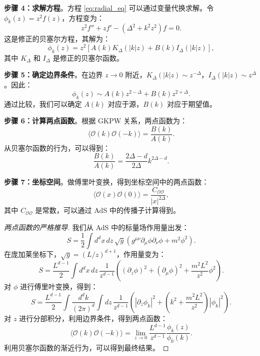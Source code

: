 \textbf{步骤 4：求解方程}。方程 \eqref{eq:radial_eq} 可以通过变量代换求解。令 $\phi_k(z) = z^2 f(z)$，方程变为：
\begin{equation}
    z^2 f'' + z f' - \left(\Delta^2 + k^2 z^2\right) f = 0.
\end{equation}
这是修正的贝塞尔方程，其解为：
\begin{equation}
    \phi_k(z) = z^2 \left[ A(k) K_\Delta(|k|z) + B(k) I_\Delta(|k|z) \right],
\end{equation}
其中 $K_\Delta$ 和 $I_\Delta$ 是修正的贝塞尔函数。

\textbf{步骤 5：确定边界条件}。在边界 $z \to 0$ 附近，$K_\Delta(|k|z) \sim z^{-\Delta}$，$I_\Delta(|k|z) \sim z^\Delta$。因此：
\begin{equation}
    \phi_k(z) \sim A(k) z^{2-\Delta} + B(k) z^{2+\Delta}.
\end{equation}
通过比较，我们可以确定 $A(k)$ 对应于源，$B(k)$ 对应于期望值。

\textbf{步骤 6：计算两点函数}。根据 GKPW 关系，两点函数为：
\begin{equation}
    \langle \mathcal{O}(k) \mathcal{O}(-k) \rangle = \frac{B(k)}{A(k)}.
\end{equation}
从贝塞尔函数的行为，可以得到：
\begin{equation}
    \frac{B(k)}{A(k)} = \frac{2\Delta - d}{2\Delta} k^{2\Delta - d}.
\end{equation}

\textbf{步骤 7：坐标空间}。做傅里叶变换，得到坐标空间中的两点函数：
\begin{equation}
    \langle \mathcal{O}(x) \mathcal{O}(0) \rangle = \frac{C_{\mathcal{O}\mathcal{O}}}{|x|^{2\Delta}},
\end{equation}
其中 $C_{\mathcal{O}\mathcal{O}}$ 是常数，可以通过 AdS 中的传播子计算得到。

\begin{proof}[两点函数的严格推导]
我们从 AdS 中的标量场作用量出发：
\begin{equation}
    S = \frac{1}{2} \int d^d x \, dz \, \sqrt{g} \left( g^{\mu\nu} \partial_\mu \phi \partial_\nu \phi + m^2 \phi^2 \right).
\end{equation}
在庞加莱坐标下，$\sqrt{g} = (L/z)^{d+1}$，作用量变为：
\begin{equation}
    S = \frac{L^{d-1}}{2} \int d^d x \, dz \, \frac{1}{z^{d-1}} \left( (\partial_z \phi)^2 + (\partial_\mu \phi)^2 + \frac{m^2 L^2}{z^2} \phi^2 \right).
\end{equation}
对 $\phi$ 进行傅里叶变换，得到：
\begin{equation}
    S = \frac{L^{d-1}}{2} \int \frac{d^d k}{(2\pi)^d} \int dz \, \frac{1}{z^{d-1}} \left( |\partial_z \phi_k|^2 + \left(k^2 + \frac{m^2 L^2}{z^2}\right) |\phi_k|^2 \right).
\end{equation}
对 $z$ 进行分部积分，利用边界条件，得到两点函数：
\begin{equation}
    \langle \mathcal{O}(k) \mathcal{O}(-k) \rangle = \lim_{z \to 0} \frac{L^{d-1}}{z^{d-1}} \frac{\phi_k(z)}{\phi_0(k)}.
\end{equation}
利用贝塞尔函数的渐近行为，可以得到最终结果。
\end{proof}

